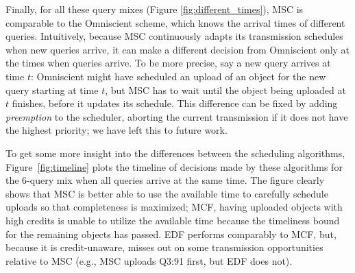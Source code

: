 
Finally, for all these query mixes (Figure \ref{fig:different_times}),
MSC is comparable to the Omniscient scheme, which knows the arrival
times of different queries.
%
Intuitively, because MSC continuously adapts its transmission
schedules when new queries arrive, it can make a different decision
from Omniscient only at the times when queries arrive.
%
To be more precise, say a new query arrives at time $t$: Omniscient
might have scheduled an upload of an object for the new query starting
at time $t$, but MSC has to wait until the object being uploaded at
$t$ finishes, before it updates its schedule.
%
This difference can be fixed by adding \emph{preemption} to the
scheduler, aborting the current transmission if it does not have the
highest priority; we have left this to future work.



To get some more insight into the differences between the scheduling
algorithms, Figure~\ref{fig:timeline} plots the timeline of decisions
made by these algorithms for the 6-query mix when all queries arrive
at the same time.
%
The figure clearly shows that MSC is better able to use the available
time to carefully schedule uploads so that completeness is maximized;
MCF, having uploaded objects with high credits is unable to utilize
the available time because the timeliness bound for the remaining
objects has passed.
%
EDF performs comparably to MCF, but, because it is credit-unaware,
misses out on some transmission opportunities relative to MSC (e.g.,
MSC uploads Q3:91 first, but EDF does not).

